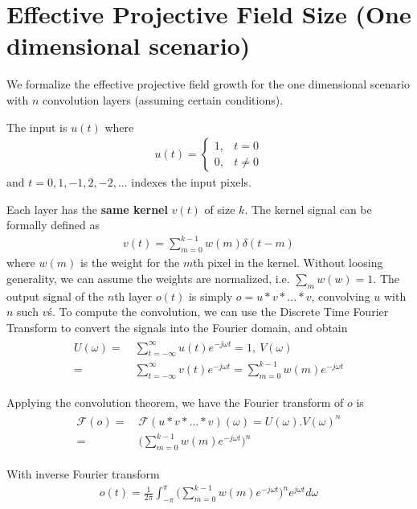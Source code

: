 \section{Effective Projective Field Size (One dimensional scenario)}

We formalize the effective projective field growth for the one dimensional scenario with $n$ convolution layers (assuming certain conditions).

The input is $u(t)$ where
\begin{align}
	u(t) = 
	\begin{cases}
		1, & t = 0\\
		0, & t \neq 0 
	\end{cases}
\end{align}
and $t = 0, 1, -1, 2, -2, ...$ indexes the input pixels.

Each layer has the \textbf{same kernel} $v(t)$ of size $k$. The kernel signal can be formally defined as
\begin{align}
	v(t) = \sum_{m=0}^{k-1} w(m)\delta(t-m)
\end{align}
where $w(m)$ is the weight for the $m$th pixel in the kernel.
Without loosing generality, we can assume the weights are normalized, i.e. $\sum_{m}w(w)=1$. The output signal of the $n$th layer $o(t)$ is simply $o = u * v * ... * v$, convolving $u$ with $n$ such $v$\'s.
To compute the convolution, we can use the Discrete Time Fourier Transform to convert the signals into the Fourier domain, and obtain
\begin{align}
\begin{split}
	U(\omega) =&~ \sum_{t=-\infty}^{\infty} u(t)e^{-j\omega t} = 1, ~V(\omega) \\=&~ \sum_{t=-\infty}^{\infty} v(t)e^{-j\omega t} = \sum_{m=0}^{k-1} w(m)e^{-j\omega t}
\end{split}
\end{align}

Applying the convolution theorem, we have the Fourier transform of $o$ is
\begin{align}
\begin{split}
	\mathcal{F}(o) =&~ \mathcal{F}(u*v*...*v)(\omega) = U(\omega) . V(\omega)^n \\=&~ \Bigg(\sum_{m=0}^{k-1}w(m)e^{-j\omega t}\Bigg)^n
\end{split}
\end{align}

With inverse Fourier transform
\begin{align}
	o(t) = \frac{1}{2\pi}\int_{-\pi}^{\pi}\Big(\sum_{m=0}^{k-1}w(m)e^{-j\omega t}\Big)^ne^{j\omega t} d\omega
\end{align}


